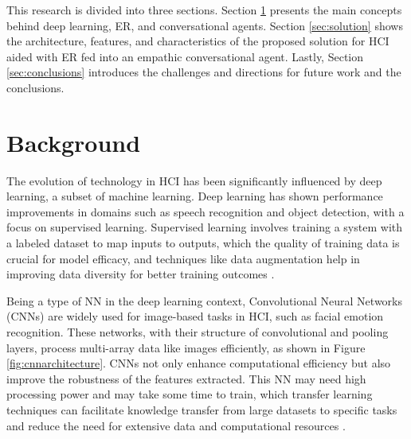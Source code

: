 \documentclass[runningheads]{llncs}
\begin{document}
This research is divided into three sections. Section \ref{sec:background} presents the main concepts behind deep learning, ER, and conversational agents. Section \ref{sec:solution} shows the architecture, features, and characteristics of the proposed solution for HCI aided with ER fed into an empathic conversational agent. Lastly, Section \ref{sec:conclusions}  introduces the challenges and directions for future work and the conclusions. 

\section{Background}
\label{sec:background}

The evolution of technology in HCI has been significantly influenced by deep learning, a subset of machine learning. Deep learning has shown performance improvements in domains such as speech recognition and object detection, with a focus on supervised learning. Supervised learning involves training a system with a labeled dataset to map inputs to outputs, which the quality of training data is crucial for model efficacy, and techniques like data augmentation help in improving data diversity for better training outcomes \cite{Alrowais2023, Lecun2015}.

Being a type of NN in the deep learning context, Convolutional Neural Networks (CNNs) are widely used for image-based tasks in HCI, such as facial emotion recognition. These networks, with their structure of convolutional and pooling layers, process multi-array data like images efficiently, as shown in Figure \ref{fig:cnnarchitecture}. CNNs not only enhance computational efficiency but also improve the robustness of the features extracted. This NN may need high processing power and may take some time to train, which transfer learning techniques can facilitate knowledge transfer from large datasets to specific tasks and reduce the need for extensive data and computational resources \cite{Lecun2015, Khan2020}.
\end{document}
